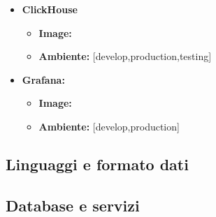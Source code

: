 \begin{itemize}
  \item \textbf{ClickHouse} 
  \begin{itemize}
    \item \textbf{Image:}
    \item \textbf{Ambiente:} [develop,production,testing]
  \end{itemize}
  \item \textbf{Grafana:} 
  \begin{itemize}
    \item \textbf{Image:}
    \item \textbf{Ambiente:} [develop,production]
  \end{itemize}
\end{itemize}

\subsection{Linguaggi e formato dati}






\subsection{Database e servizi}







